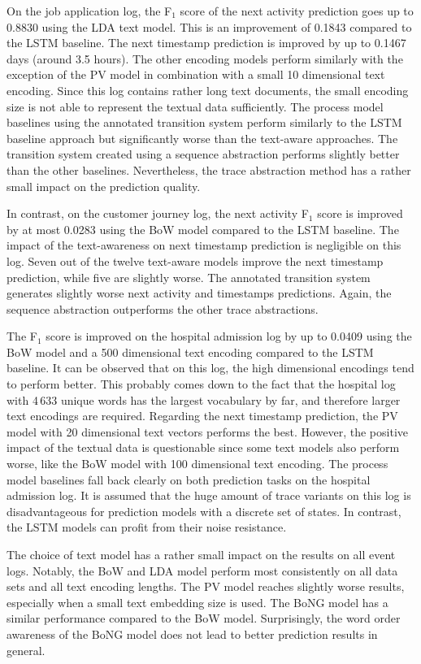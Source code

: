On the job application log, the F$_1$ score of the next activity prediction goes up to 0.8830 using the LDA text model.
This is an improvement of 0.1843 compared to the LSTM baseline.
The next timestamp prediction is improved by up to 0.1467 days (around 3.5 hours).
The other encoding models perform similarly with the exception of the PV model in combination with a small 10 dimensional text encoding.
Since this log contains rather long text documents, the small encoding size is not able to represent the textual data sufficiently.
The process model baselines using the annotated transition system perform similarly to the LSTM baseline approach but significantly worse than the text-aware approaches.
The transition system created using a sequence abstraction performs slightly better than the other baselines.
Nevertheless, the trace abstraction method has a rather small impact on the prediction quality.

In contrast, on the customer journey log, the next activity F$_1$ score is improved by at most 0.0283 using the BoW model compared to the LSTM baseline.
The impact of the text-awareness on next timestamp prediction is negligible on this log.
Seven out of the twelve text-aware models improve the next timestamp prediction, while five are slightly worse.
The annotated transition system generates slightly worse next activity and timestamps predictions.
Again, the sequence abstraction outperforms the other trace abstractions.

The F$_1$ score is improved on the hospital admission log by up to 0.0409 using the BoW model and a 500 dimensional text encoding compared to the LSTM baseline.
It can be observed that on this log, the high dimensional encodings tend to perform better.
This probably comes down to the fact that the hospital log with 4\,633 unique words has the largest vocabulary by far, and therefore larger text encodings are required.
Regarding the next timestamp prediction, the PV model with 20 dimensional text vectors performs the best.
However, the positive impact of the textual data is questionable since some text models also perform worse, like the BoW model with 100 dimensional text encoding.
The process model baselines fall back clearly on both prediction tasks on the hospital admission log.
It is assumed that the huge amount of trace variants on this log is disadvantageous for prediction models with a discrete set of states.
In contrast, the LSTM models can profit from their noise resistance.

The choice of text model has a rather small impact on the results on all event logs.
Notably, the BoW and LDA model perform most consistently on all data sets and all text encoding lengths.
The PV model reaches slightly worse results, especially when a small text embedding size is used.
The BoNG model has a similar performance compared to the BoW model.
Surprisingly, the word order awareness of the BoNG model does not lead to better prediction results in general.

